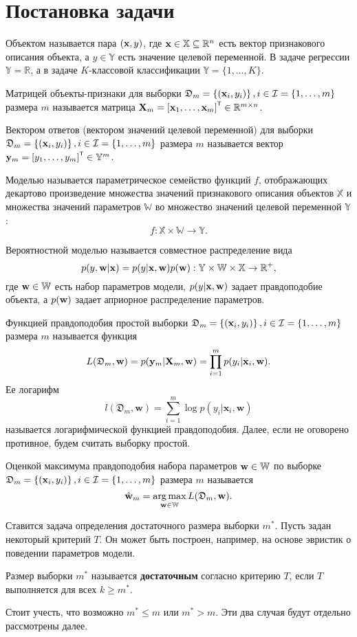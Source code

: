 \section{Постановка задачи}\label{sec1}

Объектом называется пара $(\mathbf{x}, y)$, где $\mathbf{x} \in \mathbb{X} \subseteq \mathbb{R}^n$ есть вектор признакового описания объекта, а $y \in \mathbb{Y}$ есть значение целевой переменной. В задаче регрессии $\mathbb{Y} = \mathbb{R}$, а в задаче $K$-классовой классификации $\mathbb{Y} = \{1, \ldots, K\}$.

Матрицей объекты-признаки для выборки $\mathfrak{D}_m = \left\{ (\mathbf{x}_i, y_i) \right\}, i \in \mathcal{I} = \{ 1, \ldots, m \}$ размера $m$ называется матрица $\bX_m = \left[ \bx_1, \ldots, \bx_m \right]\T \in \mathbb{R}^{m \times n}$.

Вектором ответов (вектором значений целевой переменной) для выборки $\mathfrak{D}_m = \left\{ (\mathbf{x}_i, y_i) \right\}, i \in \mathcal{I} = \{ 1, \ldots, m \}$ размера $m$ называется вектор $\by_m = \left[ y_1, \ldots, y_m \right]\T \in \mathbb{Y}^m$.

Моделью называется параметрическое семейство функций $f$, отображающих декартово произведение множества значений признакового описания объектов $\mathbb{X}$ и множества значений параметров $\mathbb{W}$ во множество значений целевой переменной $\mathbb{Y}$: 
\[ f: \mathbb{X} \times \mathbb{W} \to \mathbb{Y}. \]

Вероятностной моделью называется совместное распределение вида 
\[ p(y, \mathbf{w} | \mathbf{x}) = p(y | \mathbf{x}, \mathbf{w}) p(\mathbf{w}): \mathbb{Y} \times \mathbb{W} \times \mathbb{X} \to \mathbb{R}^+, \]
где $\mathbf{w} \in \mathbb{W}$ есть набор параметров модели, $p(y | \mathbf{x}, \mathbf{w})$ задает правдоподобие объекта, а $p(\mathbf{w})$ задает априорное распределение параметров.

Функцией правдоподобия простой выборки $\mathfrak{D}_m = \left\{ (\mathbf{x}_i, y_i) \right\}, i \in \mathcal{I} = \{ 1, \ldots, m \}$ размера $m$ называется функция 
\[ L(\mathfrak{D}_m, \mathbf{w}) = p(\mathbf{y}_m | \mathbf{X}_m, \mathbf{w}) = \prod_{i=1}^{m} p(y_i | \mathbf{x}_i, \mathbf{w}). \]
Ее логарифм 
\[ l(\mathfrak{D}_m, \mathbf{w}) = \sum\limits_{i=1}^{m} \log p(y_i | \mathbf{x}_i, \mathbf{w}) \]
называется логарифмической функцией правдоподобия. Далее, если не оговорено противное, будем считать выборку простой.

Оценкой максимума правдоподобия набора параметров $\mathbf{w} \in \mathbb{W}$ по выборке $\mathfrak{D}_m = \left\{ (\mathbf{x}_i, y_i) \right\}, i \in \mathcal{I} = \{ 1, \ldots, m \}$ размера $m$ называется 
\[ \hat{\mathbf{w}}_{m} = \operatorname*{arg\,max}_{\mathbf{w} \in \mathbb{W}} L(\mathfrak{D}_m, \mathbf{w}). \]

Ставится задача определения достаточного размера выборки $m^*$. Пусть задан некоторый критерий $T$. Он может быть построен, например, на основе эвристик о поведении параметров модели.
\begin{definition}
    Размер выборки $m^*$ называется \textbf{достаточным} согласно критерию $T$, если $T$ выполняется для всех $k \geqslant m^*$.
\end{definition}
Стоит учесть, что возможно $m^* \leqslant m$ или $m^* > m$. Эти два случая будут отдельно рассмотрены далее.